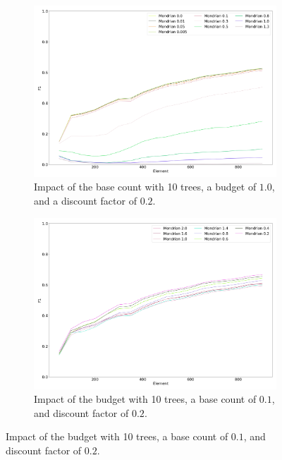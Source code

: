 \begin{figure}
	 \centering
	 \begin{subfigure}[b]{0.49\textwidth}
		\centering
		\includegraphics[width=\textwidth]{figures/calibration_mondrian_base.png}
		\caption{Impact of the base count with 10 trees, a budget of $1.0$, and a discount factor of $0.2$. } 
		\label{fig:mondrian-base-count}
	\end{subfigure}
	\hfill
	 \begin{subfigure}[b]{0.49\textwidth}
		 \centering
		 \includegraphics[width=\textwidth]{figures/calibration_mondrian_lifetime.png}
		 \caption{Impact of the budget with 10 trees, a base count of $0.1$, and discount factor of $0.2$.}

\end{subfigure}
\end{figure}
